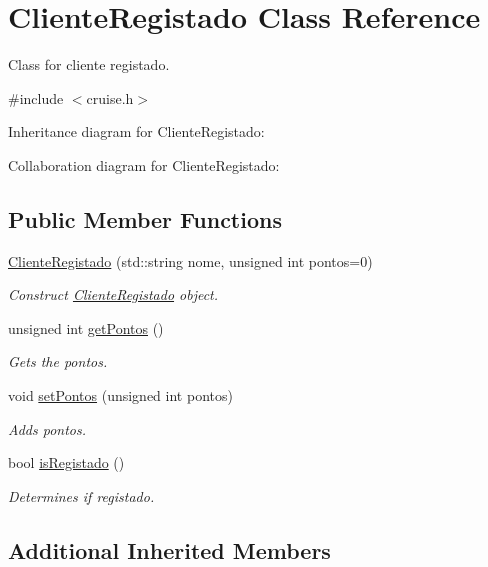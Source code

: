 \hypertarget{classClienteRegistado}{}\section{Cliente\+Registado Class Reference}
\label{classClienteRegistado}


Class for cliente registado.  




{\ttfamily \#include $<$cruise.\+h$>$}



Inheritance diagram for Cliente\+Registado\+:


Collaboration diagram for Cliente\+Registado\+:
\subsection*{Public Member Functions}
\begin{DoxyCompactItemize}
\item 
\hyperlink{classClienteRegistado_a27df6b812a22aa40e43968b4cfc7eec6}{Cliente\+Registado} (std\+::string nome, unsigned int pontos=0)
\begin{DoxyCompactList}\small\item\em Construct \hyperlink{classClienteRegistado}{Cliente\+Registado} object. \end{DoxyCompactList}\item 
unsigned int \hyperlink{classClienteRegistado_a0118e31f16e4dce542f5e1d124d26c61}{get\+Pontos} ()
\begin{DoxyCompactList}\small\item\em Gets the pontos. \end{DoxyCompactList}\item 
void \hyperlink{classClienteRegistado_a93d79ba4ecd6716124c832fc2f38ddc5}{set\+Pontos} (unsigned int pontos)
\begin{DoxyCompactList}\small\item\em Adds pontos. \end{DoxyCompactList}\item 
bool \hyperlink{classClienteRegistado_a3dade20423acb0e84c9fbe30c75f0e3e}{is\+Registado} ()
\begin{DoxyCompactList}\small\item\em Determines if registado. \end{DoxyCompactList}\end{DoxyCompactItemize}
\subsection*{Additional Inherited Members}


